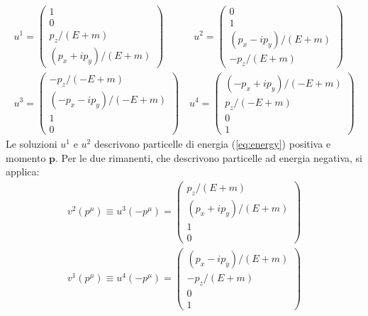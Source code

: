 \documentclass{subnucbo}
\begin{document}
\begin{equation}
        \begin{align}
                u ^ { 1 } = \left( \begin{array} { c } { 1 } \\ { 0 } \\ { p _ { z } / ( E + m ) } \\ { \left( p _ { x } + i p _ { y } \right) / ( E + m ) } \end{array} \right)\quad \quad \quad u ^ { 2 } = \left( \begin{array} { c } { 0 } \\ { 1 } \\ { \left( p _ { x } - i p _ { y } \right) / ( E + m ) } \\ { - p _ { z } / ( E + m ) } \end{array} \right) \\ u ^ { 3 } = \left( \begin{array} { c } { - p _ { z } / ( - E + m ) } \\ { \left( - p _ { x } - i p _ { y } \right) / ( - E + m ) } \\ { 1 } \\ { 0 } \end{array} \right) \quad u ^ { 4 } = \left( \begin{array} { c } { \left( - p _ { x } + i p _ { y } \right) / ( - E + m ) } \\ { p _ { z } / ( - E + m ) } \\ { 0 } \\ { 1 } \end{array} \right)
        \end{align}
        \label{eq:u1u2u3u4}
\end{equation}
Le soluzioni $u^{1}$ e $u^{2}$ descrivono particelle di energia (\ref{eq:energy}) positiva e momento $\mathbf{p}$. Per le due rimanenti, che descrivono particelle ad energia negativa, si applica:
\begin{equation}
        \begin{align}
                v ^ { 2 } \left( p ^ { \mu } \right) \equiv u ^ { 3 } \left( - p ^ { \mu } \right) = \left( \begin{array} { c } { p _ { z } / ( E + m ) } \\ { \left( p _ { x } + i p _ { y } \right) / ( E + m ) } \\ { 1 } \\ { 0 } \end{array} \right) \\ v ^ { 1 } \left( p ^ { \mu } \right) \equiv u ^ { 4 } \left( - p ^ { \mu } \right) = \left( \begin{array} { c } { \left( p _ { x } - i p _ { y } \right) / ( E + m ) } \\ { - p _ { z } / ( E + m ) } \\ { 0 } \\ { 1 } \end{array} \right)
        \end{align}
        \label{eq:v1v2}
\end{equation}
\end{document}
